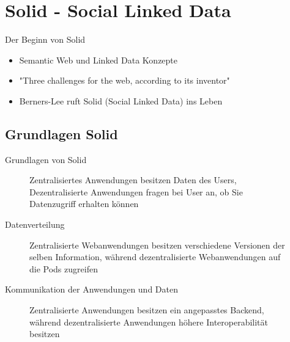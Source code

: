 \documentclass{beamer}              %
\begin{document}
\section{Solid - Social Linked Data}
\begin{frame}{Der Beginn von Solid}
\begin{itemize}
    \item Semantic Web und Linked Data Konzepte \cite{bernerslee1998semanticwebroadmap}
    \item "Three challenges for the web, according to its inventor"  \cite{webfoundation2017}
    \item Berners-Lee ruft Solid (Social Linked Data) ins Leben
\end{itemize}
\end{frame}

\subsection{Grundlagen Solid}
\begin{frame}{Grundlagen von Solid\cite{MarcoNeumann.2021}}
\begin{figure}[htbp]
  \centering
  
  \caption{Zentralisiertes Anwendungen besitzen Daten des Users, Dezentralisierte Anwendungen fragen bei User an, ob Sie Datenzugriff erhalten können}
\end{figure}
\end{frame}

\begin{frame}{Datenverteilung\cite{MarcoNeumann.2021}}
\begin{figure}[htbp]
  
  \caption{Zentralisierte Webanwendungen besitzen verschiedene Versionen der selben Information, während dezentralisierte Webanwendungen auf die Pods zugreifen}
\end{figure}
\end{frame}

\begin{frame}{Kommunikation der Anwendungen und Daten\cite{MarcoNeumann.2021}}
\begin{figure}[htbp]
  
  \caption{Zentralisierte Anwendungen besitzen ein angepasstes Backend, während dezentralisierte Anwendungen höhere Interoperabilität besitzen}
\end{figure}
\end{frame}
\end{document}
